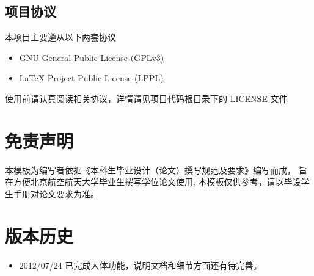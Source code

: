 \subsection{项目协议}
本项目主要遵从以下两套协议
\begin{itemize}
    \item \href{http://www.gnu.org/licenses/gpl.txt}
        {GNU General Public License (GPLv3)}
    \item \href{http://www.latex-project.org/lppl.txt}
        {\LaTeX{} Project Public License (LPPL)}
\end{itemize}
使用前请认真阅读相关协议，详情请见项目代码根目录下的 LICENSE 文件

\section{免责声明}
本模板为编写者依据《本科生毕业设计（论文）撰写规范及要求》编写而成，
旨在方便北京航空航天大学毕业生撰写学位论文使用, 本模板仅供参考，请以毕设学生手册对论文要求为准。



\section{版本历史}
\begin{itemize}
    \item[1.0] 2012/07/24 已完成大体功能，说明文档和细节方面还有待完善。
\end{itemize}

